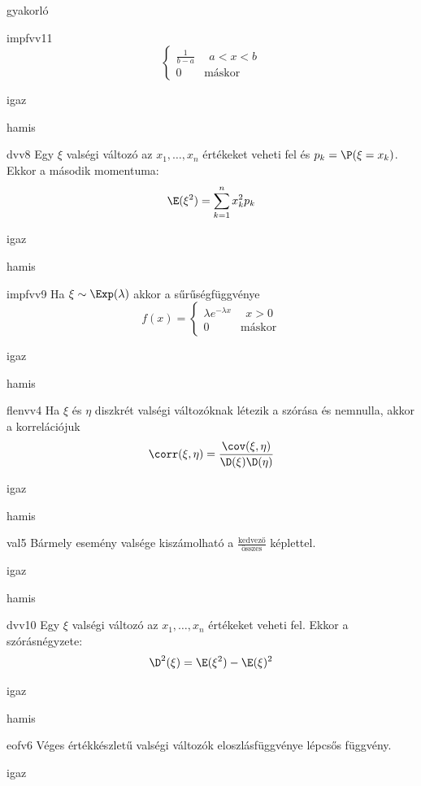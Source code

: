 \documentclass[12pt]{article}
\begin{document}
\begin{quiz}{gyakorló}
\begin{multi}[feedback={Def.}]{impfvv11}
$$\begin{cases}
\frac{1}{b-a} & \ \ a<x<b \\
0 & \text{máskor} 
\end{cases}
$$
\item* igaz
\item hamis
\end{multi}
\begin{multi}[feedback={Def.}]{dvv8}
Egy $\xi$ valségi változó az $x_1,\ldots, x_n$ értékeket veheti fel és $p_k=\P(\xi=x_k)$. 
Ekkor a második momentuma:
$$
\E(\xi^2)=\sum_{k=1}^n x_k^2 p_k
$$
\item* igaz
\item hamis
\end{multi}
\begin{multi}[feedback={Def.}]{impfvv9}
Ha $\xi\sim \Exp(\lambda)$ akkor a sűrűségfüggvénye 
$$
f(x)=
\begin{cases}
\lambda e^{-\lambda x}& \ \ x>0\\
0 & \text{máskor} 
\end{cases}
$$
\item* igaz
\item hamis
\end{multi}
\begin{multi}[feedback={Def.}]{flenvv4}
Ha $\xi$ és $\eta$ diszkrét valségi változóknak létezik a szórása és nemnulla, akkor a 
korrelációjuk
$$
\corr(\xi,\eta)=\frac{\cov(\xi,\eta)}{\D(\xi)\D(\eta)}
$$
\item* igaz
\item hamis
\end{multi}
\begin{multi}[feedback={Csak ha az elemi események egyforma valségűek.}]{val5}
Bármely esemény valsége kiszámolható a $\frac{\text{kedvező}}{\text{összes}}$ képlettel.
\item igaz
\item* hamis
\end{multi}
\begin{multi}[feedback={Def./tulajdonság}]{dvv10}
Egy $\xi$ valségi változó az $x_1,\ldots, x_n$ értékeket veheti fel. 
Ekkor a szórásnégyzete:
$$
\D^2(\xi)=\E(\xi^2)-\E(\xi)^2
$$
\item* igaz
\item hamis
\end{multi}
\begin{multi}[feedback={Az $F(x)=\P(\xi<x)$ konstans az $(a,b)$-n ha $a$ és $b$ két szomszédos eleme az értékkészletnek.}]{eofv6}
Véges értékkészletű valségi változók eloszlásfüggvénye lépcsős függvény.
\item* igaz

\end{multi}
\end{quiz}
\end{document}
